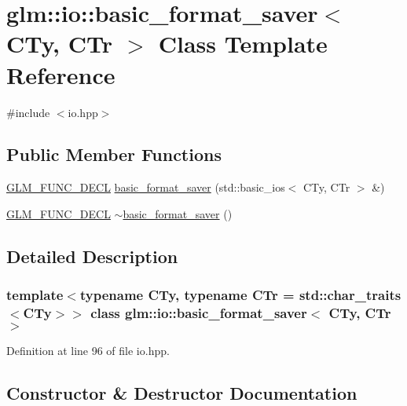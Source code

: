\hypertarget{classglm_1_1io_1_1basic__format__saver}{}\section{glm\+::io\+::basic\+\_\+format\+\_\+saver$<$ C\+Ty, C\+Tr $>$ Class Template Reference}
\label{classglm_1_1io_1_1basic__format__saver}


{\ttfamily \#include $<$io.\+hpp$>$}

\subsection*{Public Member Functions}
\begin{DoxyCompactItemize}
\item 
\mbox{\hyperlink{setup_8hpp_ab2d052de21a70539923e9bcbf6e83a51}{G\+L\+M\+\_\+\+F\+U\+N\+C\+\_\+\+D\+E\+CL}} \mbox{\hyperlink{classglm_1_1io_1_1basic__format__saver_a9688fa6dce0c32285527df2336ca9127}{basic\+\_\+format\+\_\+saver}} (std\+::basic\+\_\+ios$<$ C\+Ty, C\+Tr $>$ \&)
\item 
\mbox{\hyperlink{setup_8hpp_ab2d052de21a70539923e9bcbf6e83a51}{G\+L\+M\+\_\+\+F\+U\+N\+C\+\_\+\+D\+E\+CL}} \mbox{\hyperlink{classglm_1_1io_1_1basic__format__saver_a49d58d91548a071d5f660c74ca88979b}{$\sim$basic\+\_\+format\+\_\+saver}} ()
\end{DoxyCompactItemize}


\subsection{Detailed Description}
\subsubsection*{template$<$typename C\+Ty, typename C\+Tr = std\+::char\+\_\+traits$<$\+C\+Ty$>$$>$\newline
class glm\+::io\+::basic\+\_\+format\+\_\+saver$<$ C\+Ty, C\+Tr $>$}



Definition at line 96 of file io.\+hpp.



\subsection{Constructor \& Destructor Documentation}
\mbox{\label{classglm_1_1io_1_1basic__format__saver_a9688fa6dce0c32285527df2336ca9127}} 
